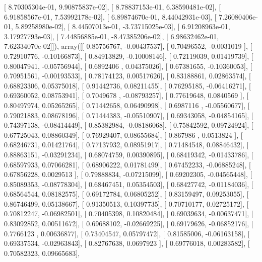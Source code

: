 \documentclass{article}
\begin{document}
       [  8.70305304e-01,   9.90875837e-02],
       [  8.78837153e-01,   6.38590481e-02],
       [  6.91858567e-01,   7.53992178e-02],
       [  6.89874670e-01,   8.44042931e-03],
       [  7.26080406e-01,   5.89258980e-02],
       [  8.44507013e-01,  -3.73715025e-03],
       [  6.91208963e-01,   3.17927793e-03],
       [  7.44856885e-01,  -8.47385206e-02],
       [  6.98632462e-01,   7.62334070e-02]]), array([[ 0.85756767, -0.00437537],
       [ 0.70496552, -0.0031019 ],
       [ 0.72910776, -0.10166873],
       [ 0.84913829, -0.10008146],
       [ 0.72119039,  0.01419739],
       [ 0.80047941, -0.05756944],
       [ 0.6892406 ,  0.04375026],
       [ 0.67381655, -0.10360053],
       [ 0.70951561, -0.00193533],
       [ 0.78174123,  0.00517626],
       [ 0.83188861,  0.02863574],
       [ 0.68823306,  0.05375018],
       [ 0.91442736,  0.08211455],
       [ 0.76295185, -0.06416271],
       [ 0.69360052,  0.08753941],
       [ 0.7049678 , -0.08793257],
       [ 0.77619648,  0.0840569 ],
       [ 0.80497974,  0.05265265],
       [ 0.71442658,  0.06490998],
       [ 0.6987116 , -0.05560677],
       [ 0.79021883,  0.08678196],
       [ 0.71444383, -0.05510907],
       [ 0.69343058, -0.04854165],
       [ 0.74397138, -0.08414449],
       [ 0.85382984, -0.08186068],
       [ 0.75842592,  0.09724924],
       [ 0.67725043,  0.08860349],
       [ 0.76929407,  0.08655684],
       [ 0.867986  ,  0.0513824 ],
       [ 0.68246731,  0.01421764],
       [ 0.77137932,  0.08951917],
       [ 0.71484548,  0.08846432],
       [ 0.88863151, -0.03291234],
       [ 0.68074759,  0.00390895],
       [ 0.68419342, -0.01433786],
       [ 0.68597933,  0.07066281],
       [ 0.68906222,  0.01781499],
       [ 0.67452233, -0.06885248],
       [ 0.67856228,  0.0029513 ],
       [ 0.79888834, -0.07215099],
       [ 0.69202305, -0.04565448],
       [ 0.85089353, -0.08778304],
       [ 0.68467451,  0.05354503],
       [ 0.68427742, -0.01184036],
       [ 0.68564544,  0.08182575],
       [ 0.69172784,  0.06805252],
       [ 0.83159497,  0.09253055],
       [ 0.86746499,  0.05138667],
       [ 0.91350513,  0.10397735],
       [ 0.70710177,  0.02725172],
       [ 0.70812247, -0.06982501],
       [ 0.70405398,  0.10820484],
       [ 0.69039634, -0.00637471],
       [ 0.83092852,  0.00511672],
       [ 0.69688102, -0.02669225],
       [ 0.69179626, -0.06852176],
       [ 0.7766123 ,  0.00636877],
       [ 0.73404547,  0.05797472],
       [ 0.81585006, -0.06163158],
       [ 0.69337534, -0.02963843],
       [ 0.82767638,  0.0697923 ],
       [ 0.69776018,  0.00283582],
       [ 0.70582323,  0.09665683],
\end{document}
